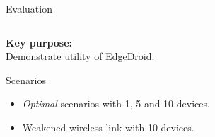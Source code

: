 \documentclass[aspectratio=1610]{beamer}
\begin{document}
\begin{frame}{Evaluation}
    \begin{columns}[onlytextwidth]
        \begin{column}{.5\textwidth}
            \begin{center}
                \textbf{Key purpose:}\\
                Demonstrate utility of EdgeDroid.\\
            \end{center}
            \vspace{.1\textheight}
            \begin{block}{Scenarios}
                \begin{itemize}
                    \item \emph{Optimal} scenarios with 1, 5 and 10 devices.
                    \item Weakened wireless link with 10 devices.
                \end{itemize}
            \end{block}
        \end{column}
        \begin{column}{.5\textwidth}
            \begin{table}[]
                \centering%
                \footnotesize%
                \caption{Latency bounds (\textcite{Chen:AnEmpiricalStudyOfLatency}).}%
                \label{my-label}%
            \end{table}
        \end{column}
    \end{columns}
\end{frame}
\end{document}
